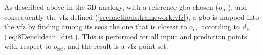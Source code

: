 \documentclass[final,twocolumn,12pt]{elsarticle}
\newcommand{\inpt}{input}
\newcommand{\outpt}{prediction}
\begin{document}

As described above in the 3D analogy, with a reference \gls{gbo} chosen ($o_{\text{ref}}$), and consequently the \gls{vfz} defined (\cref{sec:methods:framework:vfz}), a \gls{gbo} is mapped into the \gls{vfz} by finding among its \glspl{seo} the one that is closest to $o_{\text{ref}}$ according to $d_{\text{E}}$ (\cref{eq:8Deuclidean_dist}). This is performed for all \inpt{} and \outpt{} points with respect to $o_{\text{ref}}$, and the result is a \gls{vfz} point set.


\end{document}
